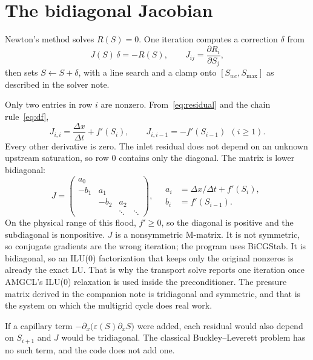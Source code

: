 \documentclass[11pt]{article}
\begin{document}
\section{The bidiagonal Jacobian}

Newton's method solves $R(S) = 0$.
One iteration computes a correction $\delta$ from
\begin{equation}
\label{eq:newton}
J(S)\,\delta = -R(S),
\qquad
J_{ij} = \frac{\partial R_i}{\partial S_j},
\end{equation}
then sets $S \leftarrow S + \delta$, with a line search and a clamp onto $[S_{wc}, S_{\max}]$ as described in the solver note.

Only two entries in row $i$ are nonzero.
From~\eqref{eq:residual} and the chain rule~\eqref{eq:df},
\begin{equation}
\label{eq:jacobian}
J_{i,i} = \frac{\Delta x}{\Delta t} + f'(S_i),
\qquad
J_{i,i-1} = -f'(S_{i-1})\ \ (i \ge 1).
\end{equation}
Every other derivative is zero.
The inlet residual does not depend on an unknown upstream saturation, so row $0$ contains only the diagonal.
The matrix is lower bidiagonal:
\begin{equation}
\label{eq:bidiagonal}
J =
\begin{pmatrix}
a_0 & & & \\
-b_1 & a_1 & & \\
& -b_2 & a_2 & \\
& & \ddots & \ddots
\end{pmatrix},
\quad
\begin{aligned}
a_i &= \Delta x/\Delta t + f'(S_i),\\
b_i &= f'(S_{i-1}).
\end{aligned}
\end{equation}
On the physical range of this flood, $f' \ge 0$, so the diagonal is positive and the subdiagonal is nonpositive.
$J$ is a nonsymmetric M-matrix.
It is not symmetric, so conjugate gradients are the wrong iteration; the program uses BiCGStab.
It is bidiagonal, so an ILU(0) factorization that keeps only the original nonzeros is already the exact LU.
That is why the transport solve reports one iteration once AMGCL's ILU(0) relaxation is used inside the preconditioner.
The pressure matrix derived in the companion note is tridiagonal and symmetric, and that is the system on which the multigrid cycle does real work.

If a capillary term $-\partial_x\bigl(\varepsilon(S)\partial_x S\bigr)$ were added, each residual would also depend on $S_{i+1}$ and $J$ would be tridiagonal.
The classical Buckley--Leverett problem has no such term, and the code does not add one.
\end{document}
